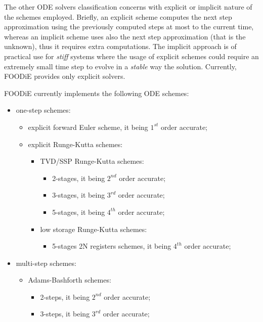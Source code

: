 \documentclass[pdftex,preprint,3p,times,numbers]{elsarticle}
\begin{document}
The other ODE solvers classification concerns with explicit or implicit nature of the schemes employed. Briefly, an explicit scheme computes the next step approximation using the previously computed steps at most to the current time, whereas an implicit scheme uses also the next step approximation (that is the unknown), thus it requires extra computations. The implicit approach is of practical use for \emph{stiff} systems where the usage of explicit schemes could require an extremely small time step to evolve in a \emph{stable} way the solution. Currently, FOODiE provides only explicit solvers.

FOODiE currently implements the following ODE schemes:

\begin{itemize}
  \item one-step schemes:
    \begin{itemize}
      \item explicit forward Euler scheme, it being $1^{st}$ order accurate;
      \item explicit Runge-Kutta schemes:
        \begin{itemize}
          \item TVD/SSP Runge-Kutta schemes:
            \begin{itemize}
              \item 2-stages, it being $2^{nd}$ order accurate;
              \item 3-stages, it being $3^{rd}$ order accurate;
              \item 5-stages, it being $4^{th}$ order accurate;
              \end{itemize}
          \item low storage Runge-Kutta schemes:
            \begin{itemize}
              \item 5-stages 2N registers schemes, it being $4^{th}$ order accurate;
              \end{itemize}
          \end{itemize}
      \end{itemize}
  \item multi-step schemes:
    \begin{itemize}
      \item Adams-Bashforth schemes:
        \begin{itemize}
          \item 2-steps, it being $2^{nd}$ order accurate;
          \item 3-steps, it being $3^{rd}$ order accurate;

\end{itemize}
\end{itemize}
\end{itemize}
\end{document}
